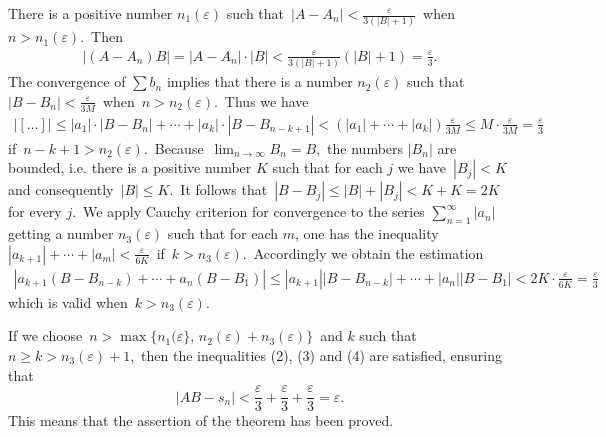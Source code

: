 \documentclass[12pt]{article}
\theoremstyle{definition}
\begin{document}
There is a positive number $n_1(\varepsilon)$ such that\,  
$|A\!-\!A_n| < \frac{\varepsilon}{3(|B|+1)}$\, when\, $n > n_1(\varepsilon)$.\, Then
\begin{align}
|(A\!-\!A_n)B| = |A\!-\!A_n|\cdot|B| < \frac{\varepsilon}{3(|B|\!+\!1)}(|B|\!+\!1) = \frac{\varepsilon}{3}.
\end{align}
The convergence of $\sum b_n$ implies that there is a number $n_2(\varepsilon)$ such that\, $|B\!-\!B_n| < \frac{\varepsilon}{3M}$\, when\, 
$n > n_2(\varepsilon)$.\, Thus we have
\begin{align}
|[\ldots]| \leq 
|a_1|\!\cdot\!|B\!-\!B_n|\!+\cdots+\!|a_k|\!\cdot\!|B\!-\!B_{n-k+1}| < 
(|a_1|\!+\cdots+\!|a_k|)\frac{\varepsilon}{3M} \leq M\!\cdot\!\frac{\varepsilon}{3M} = \frac{\varepsilon}{3}
\end{align}
if\, $n\!-\!k\!+\!1 > n_2(\varepsilon)$.\, Because\, $\lim_{n\to\infty}B_n = B$,\, the numbers $|B_n|$ are bounded, i.e. there is a positive number $K$ such that for each $j$ we have\, $|B_j| < K$\, and consequently\, $|B| \leq K$.\, It follows that\, $|B\!-\!B_j| \leq |B|\!+\!|B_j| < K\!+\!K = 2K$\, for every $j$.\, We apply Cauchy criterion for convergence to the series $\sum_{n=1}^\infty|a_n|$ getting a number $n_3(\varepsilon)$ such that for each $m$, one has the inequality\, $|a_{k+1}|+\cdots+|a_m| < \frac{\varepsilon}{6K}$\, if\, 
$k > n_3(\varepsilon)$.\, Accordingly we obtain the estimation
\begin{align}
|a_{k+1}(B\!-\!B_{n-k})\!+\cdots+\!a_n(B\!-\!B_1)| \leq |a_{k+1}||B\!-\!B_{n-k}|\!+\cdots+\!|a_n||B\!-\!B_1| < 2K\!\cdot\!\frac{\varepsilon}{6K} = \frac{\varepsilon}{3}
\end{align}
which is valid when\, $k > n_3(\varepsilon)$.

If we choose\, $n > \max\{n_1(\varepsilon\},\, n_2(\varepsilon)\!+\!n_3(\varepsilon)\}$\, and $k$ such that\, $n \geq k > n_3(\varepsilon)\!+\!1$,\, then the inequalities (2), (3) and (4) are satisfied, ensuring that
$$|AB\!-\!s_n| < 
\frac{\varepsilon}{3}\!+\!\frac{\varepsilon}{3}\!+\!\frac{\varepsilon}{3} = \varepsilon.$$
This means that the assertion of the theorem has been proved.\\
\end{document}
